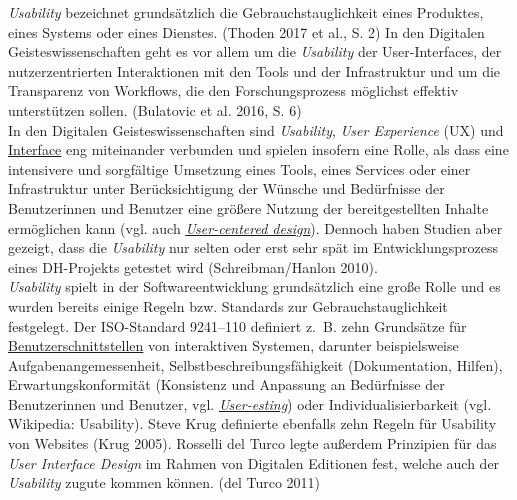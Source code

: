 \documentclass{article}
\begin{document}
    \emph{Usability} bezeichnet grundsätzlich die
                  Gebrauchstauglichkeit eines Produktes, eines Systems oder eines Dienstes.
                     (Thoden 2017 et al., S. 2) In den Digitalen Geisteswissenschaften
                  geht es vor allem um die \emph{Usability} der User-Interfaces, der
                  nutzerzentrierten Interaktionen mit den Tools und der Infrastruktur und um die
                  Transparenz von Workflows, die den Forschungsprozess möglichst effektiv
                  unterstützen sollen. (Bulatovic et al. 2016, S. 6)\\
            
        In den Digitalen Geisteswissenschaften sind \emph{Usability}, \emph{User Experience} (UX) und \href{http://gams.uni-graz.at/o:konde.98}{Interface} eng miteinander verbunden und spielen
                  insofern eine Rolle, als dass eine intensivere und sorgfältige Umsetzung eines
                  Tools, eines Services oder einer Infrastruktur unter Berücksichtigung der Wünsche
                  und Bedürfnisse der Benutzerinnen und Benutzer eine größere Nutzung der
                  bereitgestellten Inhalte ermöglichen kann (vgl. auch \emph{\href{http://gams.uni-graz.at/o:konde.207}{User-centered design}}). Dennoch haben Studien aber gezeigt, dass die \emph{Usability} nur selten oder erst sehr spät im Entwicklungsprozess eines
                  DH-Projekts getestet wird (Schreibman/Hanlon 2010).\\
            
        \emph{Usability} spielt in der Softwareentwicklung grundsätzlich
                  eine große Rolle und es wurden bereits einige Regeln bzw. Standards zur
                  Gebrauchstauglichkeit festgelegt. Der ISO-Standard 9241–110 definiert z. B. zehn
                  Grundsätze für \href{http://gams.uni-graz.at/o:konde.18}{Benutzerschnittstellen} von interaktiven Systemen, darunter
                  beispielsweise Aufgabenangemessenheit, Selbstbeschreibungsfähigkeit
                  (Dokumentation, Hilfen), Erwartungskonformität (Konsistenz und Anpassung an
                  Bedürfnisse der Benutzerinnen und Benutzer, vgl. \emph{\href{http://gams.uni-graz.at/o:konde.206}{User-esting}}) oder Individualisierbarkeit (vgl. Wikipedia: Usability). Steve
                  Krug definierte ebenfalls zehn Regeln für Usability von Websites (Krug
                     2005). Rosselli del Turco legte außerdem Prinzipien für das \emph{User Interface Design} im Rahmen von Digitalen Editionen
                  fest, welche auch der \emph{Usability} zugute kommen können.
                     (del Turco 2011)\\
            
\end{document}
